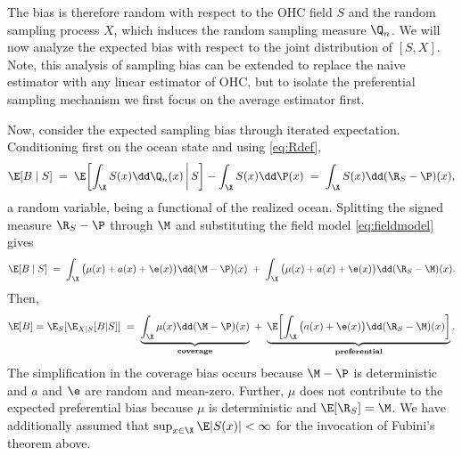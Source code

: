 The bias is therefore random with respect to the OHC field $S$ and the random sampling process $X$, which induces the random sampling measure $\Q_n$.
We will now analyze the expected bias with respect to the joint distribution of $[S,X]$.
Note, this analysis of sampling bias can be extended to replace the naive estimator with any linear estimator of OHC, but to isolate the preferential sampling mechanism we first focus on the average estimator first.

Now, consider the expected sampling bias through iterated expectation.
Conditioning first on the ocean state and using \eqref{eq:Rdef},
\begin{equation}
  \label{eq:condbias}
  \E[B \mid S]
  \;=\; \E\!\left[\int_\X S(x)\dd\Q_n(x) \,\middle|\, S\right] - \int_\X S(x)\dd\P(x)
  \;=\; \int_\X S(x) \dd(\R_S - \P)(x),
\end{equation}
a random variable, being a functional of the realized ocean. Splitting the signed measure
$\R_S - \P$ through $\M$ and substituting the field model \eqref{eq:fieldmodel} gives
\begin{equation}
  \label{eq:condsplit}
  \E[B \mid S]
  \;=\; \int_\X \big(\mu(x) + a(x) + \e(x)\big) \dd(\M - \P)(x)
  \;+\; \int_\X \big(\mu(x) + a(x) + \e(x)\big) \dd(\R_S - \M)(x).
\end{equation}
Then,
\begin{equation}
  \label{eq:biasdecomp}
  \E[B] = \E_S[\E_{X|S}[B|S]]  
  \;=\; \underbrace{\int_\X \mu(x) \dd(\M - \P)(x)}_{\textbf{coverage}}
  \;+\; \underbrace{\E\!\left[\int_\X \big(a(x) + \e(x)\big) \dd(\R_S - \M)(x)\right]}_{\textbf{preferential}} .
\end{equation}
The simplification in the coverage bias occurs because $\M - \P$ is deterministic and $a$ and $\e$ are random and mean-zero. Further, $\mu$ does not contribute to the expected preferential bias because $\mu$ is deterministic and $\E[\R_S] = \M$. We have additionally assumed that $\sup_{x \in \X} \E|S(x)| < \infty$ for the invocation of Fubini's theorem above.


